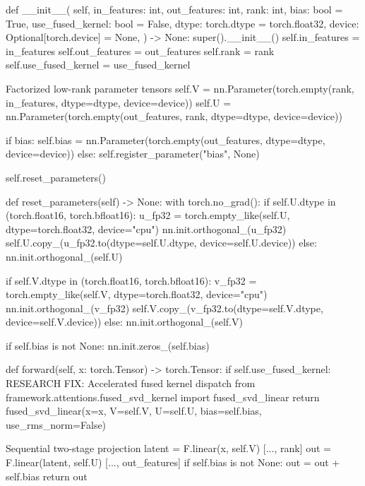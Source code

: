    def \_\_init\_\_(
        self,
        in\_features: int,
        out\_features: int,
        rank: int,
        bias: bool = True,
        use\_fused\_kernel: bool = False,
        dtype: torch.dtype = torch.float32,
        device: Optional[torch.device] = None,
    ) -> None:
        super().\_\_init\_\_()
        self.in\_features = in\_features
        self.out\_features = out\_features
        self.rank = rank
        self.use\_fused\_kernel = use\_fused\_kernel

         Factorized low-rank parameter tensors
        self.V = nn.Parameter(torch.empty(rank, in\_features, dtype=dtype, device=device))
        self.U = nn.Parameter(torch.empty(out\_features, rank, dtype=dtype, device=device))

        if bias:
            self.bias = nn.Parameter(torch.empty(out\_features, dtype=dtype, device=device))
        else:
            self.register\_parameter("bias", None)

        self.reset\_parameters()

    def reset\_parameters(self) -> None:
        with torch.no\_grad():
            if self.U.dtype in (torch.float16, torch.bfloat16):
                u\_fp32 = torch.empty\_like(self.U, dtype=torch.float32, device="cpu")
                nn.init.orthogonal\_(u\_fp32)
                self.U.copy\_(u\_fp32.to(dtype=self.U.dtype, device=self.U.device))
            else:
                nn.init.orthogonal\_(self.U)

            if self.V.dtype in (torch.float16, torch.bfloat16):
                v\_fp32 = torch.empty\_like(self.V, dtype=torch.float32, device="cpu")
                nn.init.orthogonal\_(v\_fp32)
                self.V.copy\_(v\_fp32.to(dtype=self.V.dtype, device=self.V.device))
            else:
                nn.init.orthogonal\_(self.V)

            if self.bias is not None:
                nn.init.zeros\_(self.bias)

    def forward(self, x: torch.Tensor) -> torch.Tensor:
        if self.use\_fused\_kernel:
             RESEARCH FIX: Accelerated fused kernel dispatch
            from framework.attentions.fused\_svd\_kernel import fused\_svd\_linear
            return fused\_svd\_linear(x=x, V=self.V, U=self.U, bias=self.bias, use\_rms\_norm=False)

         Sequential two-stage projection
        latent = F.linear(x, self.V)   [..., rank]
        out = F.linear(latent, self.U)   [..., out\_features]
        if self.bias is not None:
            out = out + self.bias
        return out

